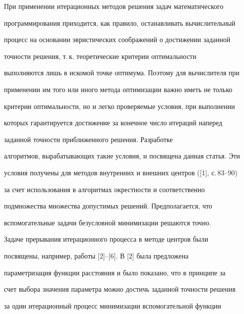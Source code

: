 

\maketitle


\label{begin}








При применении итерационных методов решения задач математического


программирования приходится, как правило, останавливать вычислительный


процесс на основании эвристических соображений о достижении заданной


точности решения, т.\,к. теоретические критерии оптимальности


выполняются лишь в искомой точке оптимума. Поэтому для вычислителя при


применении им того или иного метода оптимизации важно иметь не только


критерии оптимальности, но и легко проверяемые условия, при выполнении


которых гарантируется достижение за конечное число итераций наперед


заданной точности приближенного решения. Разработке


алгоритмов, вырабатывающих такие условия, и посвящена данная статья. Эти


условия получены для методов внутренних и внешних центров ([1], с.\,83--90)


за счет использования в алгоритмах окрестности и соответственно


подмножества множества допустимых решений. Предполагается, что


вспомогательные задачи безусловной минимизации решаются точно.





Задаче прерывания итерационного процесса в методе центров были


посвящены, например, работы [2]--[6]. В [2] была предложена


параметризация функции расстояния и было показано, что в принципе за


счет выбора значения параметра можно достичь заданной точности решения


за один итерационный процесс минимизации вспомогательной функции


